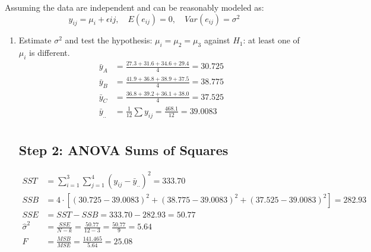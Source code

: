 \documentclass{article}
\begin{document}
Assuming the data are independent and can be reasonably modeled as:
$$
	y_{ij}= \mu_i + \epsilon{ij}, \quad E(e_{ij})=0, \quad Var(e_{ij})= \sigma^2
$$
\begin{enumerate}
	\item Estimate $\sigma^2$ and test the hypothesis: $\mu_i = \mu_2 = \mu_3$ against $H_1$: at least one of $\mu_i$ is different.
	      \[
		      \begin{split}
			      \bar{y}_A    & = \frac{27.3 + 31.6 + 34.6 + 29.4}{4} = 30.725          \\
			      \bar{y}_B    & = \frac{41.9 + 36.8 + 38.9 + 37.5}{4} = 38.775          \\
			      \bar{y}_C    & = \frac{36.8 + 39.2 + 36.1 + 38.0}{4} = 37.525          \\
			      \bar{y}_{..} & = \frac{1}{12} \sum y_{ij} = \frac{468.1}{12} = 39.0083 \\
		      \end{split}
	      \]
	      \subsection*{Step 2: ANOVA Sums of Squares}

	      \[
		      \begin{split}
			      SST            & = \sum_{i=1}^{3} \sum_{j=1}^{4} (y_{ij} - \bar{y}_{..})^2 = 333.70                                   \\
			      SSB            & = 4 \cdot \left[ (30.725 - 39.0083)^2 + (38.775 - 39.0083)^2 + (37.525 - 39.0083)^2 \right] = 282.93 \\
			      SSE            & = SST - SSB = 333.70 - 282.93 = 50.77                                                                \\
			      \hat{\sigma}^2 & = \frac{SSE}{N - k} = \frac{50.77}{12 - 3} = \frac{50.77}{9} = 5.64                                  \\
			      F              & = \frac{MSB}{MSE} = \frac{141.465}{5.64} = 25.08                                                     \\
		      \end{split}
	      \]


\end{enumerate}
\end{document}
